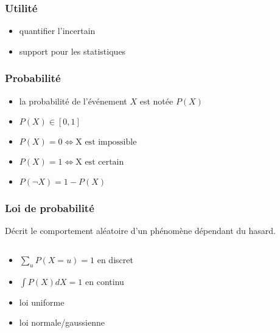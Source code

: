 
\begin{frame}
  \frametitle{Utilité}
  \begin{itemize}
  \item quantifier l'incertain
  \item support pour les statistiques
  \end{itemize}
\end{frame}

\begin{frame}
  \frametitle{Probabilité}

  \begin{itemize}
  \item la probabilité de l'événement $X$ est notée $P(X)$
  \item $P(X) \in [0, 1]$
  \item $P(X)=0 \iff \text{X est impossible}$
  \item $P(X)=1 \iff \text{X est certain}$
  \item $P(\neg X) = 1 - P(X)$
  
  \end{itemize}
\end{frame}

\begin{frame}
  \frametitle{Loi de probabilité}

  Décrit le comportement aléatoire d'un phénomène dépendant du hasard.
  \begin{columns}
    \begin{column}{.5\textwidth}
      \begin{itemize}
      \item $\sum_uP(X = u) = 1$ en discret
      \item $\int P(X)dX = 1$ en continu
      \item loi uniforme
      \item loi normale/gaussienne
      \end{itemize}
    \end{column}
    \begin{column}{.5\textwidth}
    \end{column}
  \end{columns}
\end{frame}
